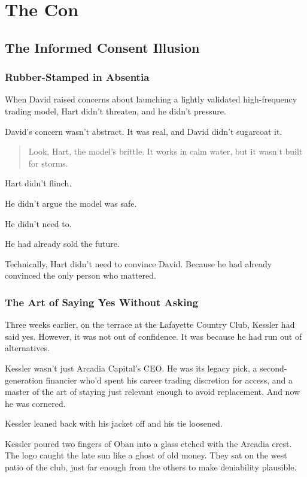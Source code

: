 
\section{The Con}

\subsection{The Informed Consent Illusion}

\subsubsection{Rubber-Stamped in Absentia}

When David raised concerns about launching a lightly validated high-frequency trading model,  
Hart didn’t threaten, and he didn’t pressure.

David’s concern wasn’t abstract. It was real, and David didn’t sugarcoat it.

\begin{quote}
  Look, Hart, the model’s brittle. It works in calm water, but it wasn’t built for storms.
\end{quote}

Hart didn’t flinch.  

He didn’t argue the model was safe.  

He didn’t need to.  

He had already sold the future.

Technically, Hart didn’t need to convince David. Because he had already convinced the only person who mattered.

\subsubsection{The Art of Saying Yes Without Asking}

Three weeks earlier, on the terrace at the Lafayette Country Club,
Kessler had said yes. However, it was not out of confidence. It was because he had run out of alternatives.

Kessler wasn’t just Arcadia Capital’s CEO. 
He was its legacy pick, a second-generation financier who’d spent his career trading discretion for access, and a master 
of the art of staying just relevant enough to avoid replacement. And now he was cornered. 

Kessler leaned back with his jacket off and his tie loosened.

Kessler poured two fingers of Oban into a glass etched with the Arcadia crest. The logo caught the late sun like a ghost 
of old money.  They sat on the west patio of the club, 
just far enough from the others to make deniability plausible.

